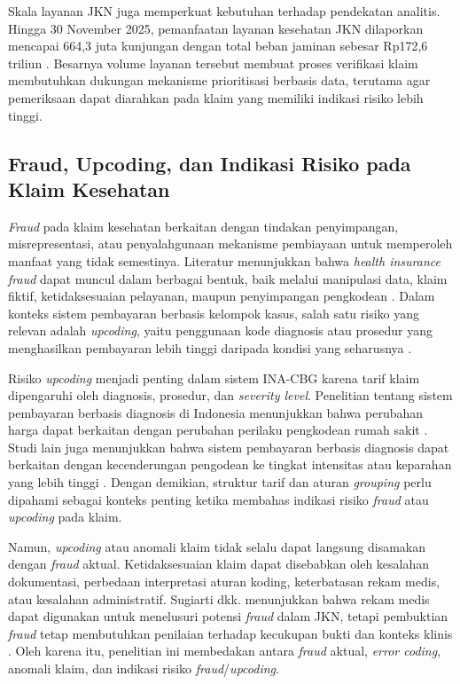 Skala layanan JKN juga memperkuat kebutuhan terhadap pendekatan analitis. Hingga 30 November 2025, pemanfaatan layanan kesehatan JKN dilaporkan mencapai 664,3 juta kunjungan dengan total beban jaminan sebesar Rp172,6 triliun \citep{djsn2025monthly}. Besarnya volume layanan tersebut membuat proses verifikasi klaim membutuhkan dukungan mekanisme prioritisasi berbasis data, terutama agar pemeriksaan dapat diarahkan pada klaim yang memiliki indikasi risiko lebih tinggi.

\subsection{Fraud, Upcoding, dan Indikasi Risiko pada Klaim Kesehatan}\label{fraud-upcoding-dan-indikasi-risiko-pada-klaim-kesehatan}

\emph{Fraud} pada klaim kesehatan berkaitan dengan tindakan penyimpangan, misrepresentasi, atau penyalahgunaan mekanisme pembiayaan untuk memperoleh manfaat yang tidak semestinya. Literatur menunjukkan bahwa \emph{health insurance fraud} dapat muncul dalam berbagai bentuk, baik melalui manipulasi data, klaim fiktif, ketidaksesuaian pelayanan, maupun penyimpangan pengkodean \citep{villegas2021,timofeyev2022}. Dalam konteks sistem pembayaran berbasis kelompok kasus, salah satu risiko yang relevan adalah \emph{upcoding}, yaitu penggunaan kode diagnosis atau prosedur yang menghasilkan pembayaran lebih tinggi daripada kondisi yang seharusnya \citep{maryana2024}.

Risiko \emph{upcoding} menjadi penting dalam sistem INA-CBG karena tarif klaim dipengaruhi oleh diagnosis, prosedur, dan \emph{severity level}. Penelitian tentang sistem pembayaran berbasis diagnosis di Indonesia menunjukkan bahwa perubahan harga dapat berkaitan dengan perubahan perilaku pengkodean rumah sakit \citep{chalkley2022}. Studi lain juga menunjukkan bahwa sistem pembayaran berbasis diagnosis dapat berkaitan dengan kecenderungan pengodean ke tingkat intensitas atau keparahan yang lebih tinggi \citep{crespin2024}. Dengan demikian, struktur tarif dan aturan \emph{grouping} perlu dipahami sebagai konteks penting ketika membahas indikasi risiko \emph{fraud} atau \emph{upcoding} pada klaim.

Namun, \emph{upcoding} atau anomali klaim tidak selalu dapat langsung disamakan dengan \emph{fraud} aktual. Ketidaksesuaian klaim dapat disebabkan oleh kesalahan dokumentasi, perbedaan interpretasi aturan koding, keterbatasan rekam medis, atau kesalahan administratif. Sugiarti dkk. menunjukkan bahwa rekam medis dapat digunakan untuk menelusuri potensi \emph{fraud} dalam JKN, tetapi pembuktian \emph{fraud} tetap membutuhkan penilaian terhadap kecukupan bukti dan konteks klinis \citep{sugiarti2021}. Oleh karena itu, penelitian ini membedakan antara \emph{fraud} aktual, \emph{error coding}, anomali klaim, dan indikasi risiko \emph{fraud}/\emph{upcoding}.

